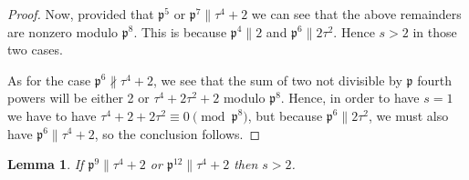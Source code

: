 \documentclass[12pt]{article}
\newtheorem{lemma}[thm]{Lemma}
\theoremstyle{remark}
\begin{document}
\begin{proof}
Now, provided that $\mathfrak{p}^5$ or $\mathfrak{p}^{7} \parallel \tau^4+2$ we can see that the above remainders are nonzero modulo $\mathfrak{p}^8$. This is because $\mathfrak{p}^4 \parallel 2$ and $\mathfrak{p}^6 \parallel 2\tau^2$. Hence $s > 2$ in those two cases. 

As for the case $\mathfrak{p}^6 \not\parallel \tau^4+2$, we see that the sum of two not divisible by $\mathfrak{p}$ fourth powers will be either 2 or $\tau^4 + 2\tau^2+2$ modulo $\mathfrak{p}^8$. Hence, in order to have $s=1$ we have to have $\tau^4+2 + 2\tau^2 \equiv 0 \pmod{\mathfrak{p}^8}$, but because $\mathfrak{p}^6 \parallel 2\tau^2$, we must also have $\mathfrak{p}^6 \parallel \tau^4 +2$, so the conclusion follows. 
\end{proof}

\begin{lemma}\label{2.3}
 If $\mathfrak{p}^{9} \parallel \tau^4+2$ or $\mathfrak{p}^{12} \parallel \tau^4+2$ then $s > 2$.  
 \end{lemma}
\end{document}
